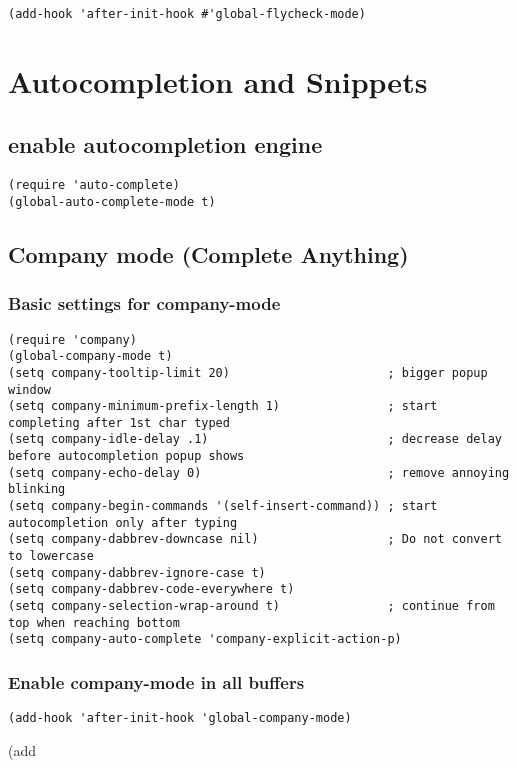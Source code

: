 \documentclass[11pt]{article}
\begin{document}
\begin{verbatim}
(add-hook 'after-init-hook #'global-flycheck-mode)
\end{verbatim}



\section*{Autocompletion and Snippets}
\label{sec:orgded9850}

\subsection*{enable autocompletion engine}
\label{sec:org3f4510e}

\begin{verbatim}
(require 'auto-complete)
(global-auto-complete-mode t)
\end{verbatim}


\subsection*{Company mode (Complete Anything)}
\label{sec:orge7eb444}


\subsubsection*{Basic settings for company-mode}
\label{sec:org8a834ea}
\begin{verbatim}
(require 'company)
(global-company-mode t)
(setq company-tooltip-limit 20)                      ; bigger popup window
(setq company-minimum-prefix-length 1)               ; start completing after 1st char typed
(setq company-idle-delay .1)                         ; decrease delay before autocompletion popup shows
(setq company-echo-delay 0)                          ; remove annoying blinking
(setq company-begin-commands '(self-insert-command)) ; start autocompletion only after typing
(setq company-dabbrev-downcase nil)                  ; Do not convert to lowercase
(setq company-dabbrev-ignore-case t)
(setq company-dabbrev-code-everywhere t)
(setq company-selection-wrap-around t)               ; continue from top when reaching bottom
(setq company-auto-complete 'company-explicit-action-p)
\end{verbatim}


\subsubsection*{Enable company-mode in all buffers}
\label{sec:orgdeb3ec7}
\begin{verbatim}
(add-hook 'after-init-hook 'global-company-mode)
\end{verbatim}
(add
\end{document}
